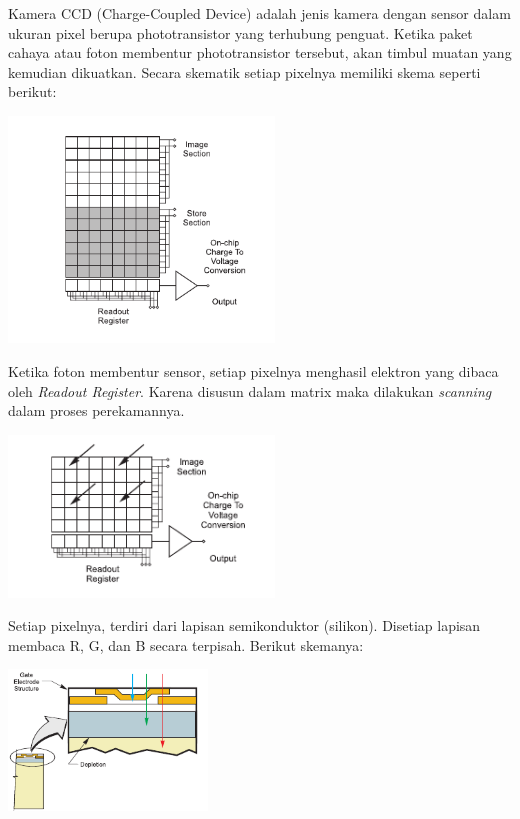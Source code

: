 \documentclass[a4paper,12pt]{article}
\begin{document}
Kamera CCD (Charge-Coupled Device) adalah jenis kamera dengan sensor dalam ukuran pixel berupa phototransistor yang terhubung penguat.
Ketika paket cahaya atau foton membentur phototransistor tersebut, akan timbul muatan yang kemudian dikuatkan.
Secara skematik setiap pixelnya memiliki skema seperti berikut:
\begin{center}
 \includegraphics[width=200pt]{ccd1}
\end{center}

Ketika foton membentur sensor, setiap pixelnya menghasil elektron yang dibaca oleh \textit{Readout Register}.
Karena disusun dalam matrix maka dilakukan \textit{scanning} dalam proses perekamannya.
\begin{center}
 \includegraphics[width=200pt]{ccd2}
\end{center}
Setiap pixelnya, terdiri dari lapisan semikonduktor (silikon).
Disetiap lapisan membaca R, G, dan B secara terpisah.
Berikut skemanya:\cite{ccd}
\begin{center}
 \includegraphics[width=150pt]{ccd3}
\end{center}
\end{document}

